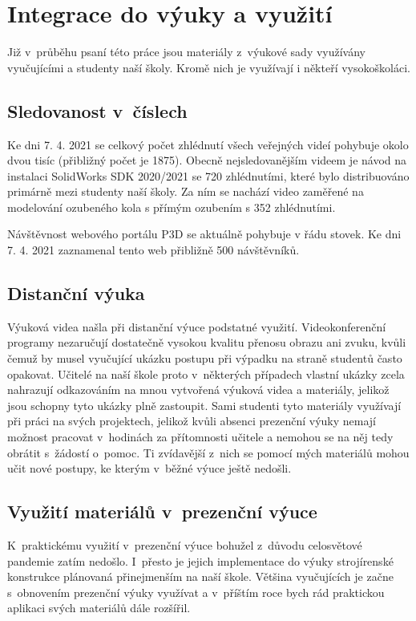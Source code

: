 \chapter{Integrace do výuky a využití}
Již v~průběhu psaní této práce jsou materiály z~výukové sady využívány vyučujícími a studenty naší školy.
Kromě nich je využívají i někteří vysokoškoláci.

\section{Sledovanost v~číslech}
Ke dni 7. 4. 2021 se celkový počet zhlédnutí všech veřejných videí pohybuje okolo dvou tisíc (přibližný počet je 1875).
Obecně nejsledovanějším videem je návod na instalaci SolidWorks SDK 2020/2021 se 720 zhlédnutími, které bylo distribuováno primárně mezi studenty naší školy.
Za ním se nachází video zaměřené na modelování ozubeného kola s přímým ozubením s 352 zhlédnutími.

Návštěvnost webového portálu P3D se aktuálně pohybuje v řádu stovek.
Ke dni 7. 4. 2021 zaznamenal tento web přibližně 500 návštěvníků.

\section{Distanční výuka}
Výuková videa našla při distanční výuce podstatné využití.
Videokonferenční programy nezaručují dostatečně vysokou kvalitu přenosu obrazu ani zvuku, kvůli čemuž by musel vyučující ukázku postupu při výpadku na straně studentů často opakovat.
Učitelé na naší škole proto v~některých případech vlastní ukázky zcela nahrazují odkazováním na mnou vytvořená výuková videa a materiály, jelikož jsou schopny tyto ukázky plně zastoupit.
Sami studenti tyto materiály využívají při práci na svých projektech, jelikož kvůli absenci prezenční výuky nemají možnost pracovat v~hodinách za přítomnosti učitele a nemohou se na něj tedy obrátit s~žádostí o~pomoc.
Ti zvídavější z~nich se pomocí mých materiálů mohou učit nové postupy, ke kterým v~běžné výuce ještě nedošli.

\section{Využití materiálů v~prezenční výuce}
K~praktickému využití v~prezenční výuce bohužel z~důvodu celosvětové pandemie zatím nedošlo. 
I~přesto je jejich implementace do výuky strojírenské konstrukce plánovaná přinejmenším na naší škole.
Většina vyučujících je začne s~obnovením prezenční výuky využívat a v~příštím roce bych rád praktickou aplikaci svých materiálů dále rozšířil.

